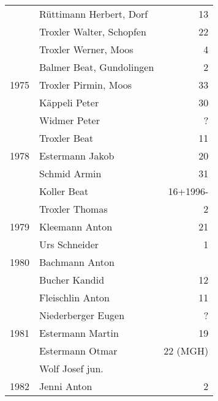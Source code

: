 {\begin{longtable}{ l l r }
                      & Rüttimann Herbert, Dorf                   & 13          \\
                      & Troxler Walter, Schopfen                  & 22          \\
                      & Troxler Werner, Moos                      & 4           \\
                      & Balmer Beat, Gundolingen                  & 2           \\
        1975          & Troxler Pirmin, Moos                      & 33          \\
                      & Käppeli Peter                             & 30          \\
                      & Widmer Peter                              & ?           \\
                      & Troxler Beat                              & 11          \\
        1978          & Estermann Jakob                           & 20          \\
                      & Schmid Armin                              & 31          \\
                      & Koller Beat                               & 16+1996-    \\
                      & Troxler Thomas                            & 2           \\
        1979          & Kleemann Anton                            & 21          \\
                      & Urs Schneider                             & 1           \\
        1980          & Bachmann Anton                            &             \\
                      & Bucher Kandid                             & 12          \\
                      & Fleischlin Anton                          & 11          \\
                      & Niederberger Eugen                        & ?           \\
        1981          & Estermann Martin                          & 19          \\
                      & Estermann Otmar                           & 22 (MGH)    \\
                      & Wolf Josef jun.                           &             \\
        1982          & Jenni Anton                               & 2           \\

\end{longtable}}
